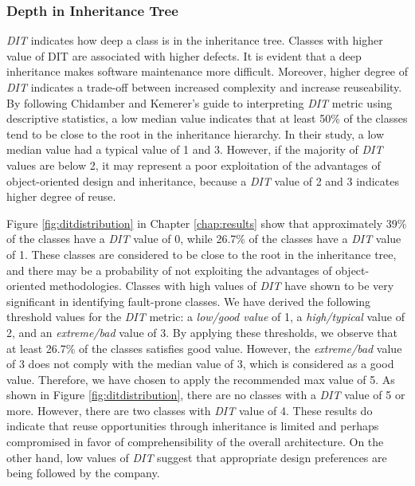 \subsubsection{Depth in Inheritance Tree}
\textit{DIT} indicates how deep a class is in the inheritance tree. Classes with higher value of DIT are associated with higher defects\cite{subramanyam2003empirical}. It is evident that a deep inheritance makes software maintenance more difficult\cite{daly1996evaluating}. Moreover, higher degree of \textit{DIT} indicates a trade-off between increased complexity and increase reuseability. By following Chidamber and Kemerer's\cite{chidamber1994metrics} guide to interpreting \textit{DIT} metric using descriptive statistics, a low median value indicates that at least 50\% of the classes tend to be close to the root in the inheritance hierarchy. In their study, a low median value had a typical value of 1 and 3. However, if the majority of \textit{DIT} values are below 2, it may represent a poor exploitation of the advantages of object-oriented design and inheritance, because a \textit{DIT} value of 2 and 3 indicates higher degree of reuse. 

Figure \ref{fig:ditdistribution} in Chapter \ref{chap:results} show that approximately 39\% of the classes have a \textit{DIT} value of 0, while 26.7\% of the classes have a \textit{DIT} value of 1. These classes are considered to be close to the root in the inheritance tree, and there may be a probability of not exploiting the advantages of object-oriented methodologies. Classes with high values of \textit{DIT} have shown to be very significant in identifying fault-prone classes\cite{basili1996validation,el2001prediction}. We have derived the following threshold values for the \textit{DIT} metric: a \textit{low/good value} of 1, a \textit{high/typical} value of 2, and an \textit{extreme/bad} value of 3. By applying these thresholds, we observe that at least 26.7\% of the classes satisfies good value. However, the \textit{extreme/bad} value of 3 does not comply with the median value of 3, which is considered as a good value\cite{chidamber1994metrics}. Therefore, we have chosen to apply the recommended max value of 5. As shown in Figure \ref{fig:ditdistribution}, there are no classes with a \textit{DIT} value of 5 or more. However, there are two classes with \textit{DIT} value of 4. These results do indicate that reuse opportunities through inheritance is limited and perhaps compromised in favor of comprehensibility of the overall architecture. On the other hand, low values of \textit{DIT} suggest that appropriate design preferences are being followed by the company\cite{subramanyam2003empirical}.

